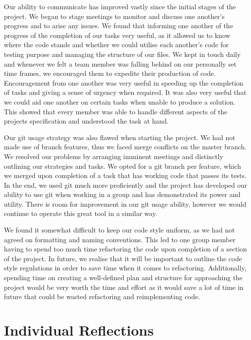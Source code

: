 \documentclass[11pt]{article}
\begin{document}
Our ability to communicate has improved vastly since the initial stages of the project.  We began to  stage meetings to monitor and discuss one another’s progress and to arise any issues. We found that informing one another of the progress of the completion of our tasks very useful, as it allowed us to know where the code stands and whether we could utilise each another’s code for testing purpose and managing the structure of our files. We kept in touch daily and whenever we felt a team member was falling behind on our personally set time frames, we encouraged them to expedite their production of code. Encouragement from one another was very useful in speeding up the completion of tasks and giving a sense of urgency when required. It was also very useful that we could aid one another on certain tasks when unable to produce a solution. This showed that every member was able to handle different aspects of the projects specification and understood the task at hand.

Our git usage strategy was also flawed when starting the project. We had not made use of branch features, thus we faced merge conflicts on the master branch. We resolved our problems by arranging imminent meetings and distinctly outlining our strategies and tasks. We opted for a git branch per feature, which we merged upon completion of a task that has working code that passes its tests. In the end, we used git much more proficiently and the project has developed our ability to use git when working in a group and has demonstrated its power and utility. There is room for improvement in our git usage ability, however we would continue to operate this great tool in a similar way.

We found it somewhat difficult to keep our code style uniform, as we had not agreed on formatting and naming conventions. This led to one group member having to spend too much time refactoring the code upon completion of a section of the project. In future, we realise that it will be important to outline the code style regulations in order to save time when it comes to refactoring. Additionally, spending time on creating a well-defined plan and structure for approaching the project would be very worth the time and effort as it would save a lot of time in future that could be wasted refactoring and reimplementing code.


\section{Individual Reflections}  
\end{document}
